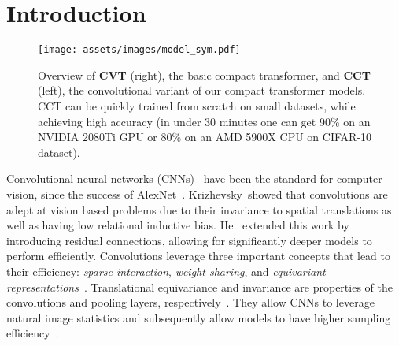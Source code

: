 \documentclass[10pt,twocolumn,letterpaper]{article}
\begin{document}
\section{Introduction}

\begin{figure}
    \centering
    \vspace{2mm}
    \texttt{[image: assets/images/model\_sym.pdf]}
    \vspace{1mm}
    \caption{Overview of \textbf{CVT} (right), the basic compact transformer, and \textbf{CCT} (left), the convolutional variant of our compact transformer models. CCT can be quickly trained from scratch on small datasets, while achieving high accuracy
    (in under 30 minutes one can get 90\% on an NVIDIA 2080Ti GPU or 80\% on an AMD 5900X CPU on CIFAR-10 dataset).
    }
    \label{fig:method_overview}
\end{figure}

Convolutional neural networks (CNNs)~\cite{lecun1989backpropagation} have been the standard for computer vision, since the success of AlexNet~\cite{krizhevsky2012imagenet}. Krizhevsky~\etal showed that convolutions are adept at vision based problems due to their invariance to spatial translations as well as having low relational inductive bias. He~\etal\cite{he2016deep} extended this work by introducing residual connections, allowing for significantly deeper models to perform efficiently. Convolutions leverage three important concepts that lead to their efficiency: \textit{sparse interaction}, \textit{weight sharing}, and \textit{equivariant representations}~\cite{goodfellow2016deep}. Translational equivariance and invariance are properties of the convolutions and pooling layers, respectively~\cite{goodfellow2016deep,schmidhuber2015deep}. They allow CNNs to leverage natural image statistics and subsequently allow models to have higher sampling efficiency~\cite{ruderman1994statistics,ruderman1994statistics}.
\end{document}
